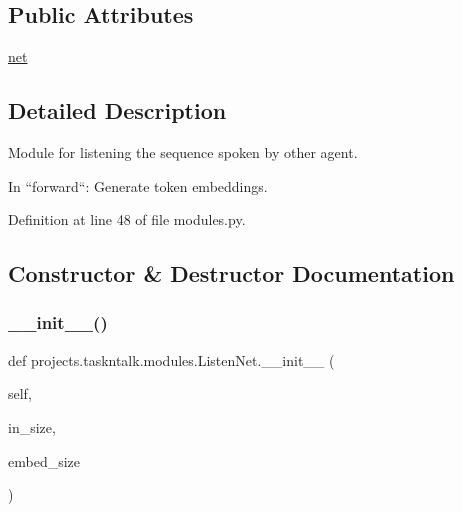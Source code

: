 \subsection*{Public Attributes}
\begin{DoxyCompactItemize}
\item 
\hyperlink{classprojects_1_1taskntalk_1_1modules_1_1ListenNet_a01d428f1730b2a3abf26c86ed72adf1b}{net}
\end{DoxyCompactItemize}


\subsection{Detailed Description}
\begin{DoxyVerb}Module for listening the sequence spoken by other agent.

In ``forward``: Generate token embeddings.
\end{DoxyVerb}
 

Definition at line 48 of file modules.\+py.



\subsection{Constructor \& Destructor Documentation}
\mbox{\label{classprojects_1_1taskntalk_1_1modules_1_1ListenNet_aecba12850e8db36a5a1b4c7c56e29836}} 
\subsubsection{\texorpdfstring{\+\_\+\+\_\+init\+\_\+\+\_\+()}{\_\_init\_\_()}}
{\footnotesize\ttfamily def projects.\+taskntalk.\+modules.\+Listen\+Net.\+\_\+\+\_\+init\+\_\+\+\_\+ (\begin{DoxyParamCaption}\item[{}]{self,  }\item[{}]{in\+\_\+size,  }\item[{}]{embed\+\_\+size }\end{DoxyParamCaption})}



